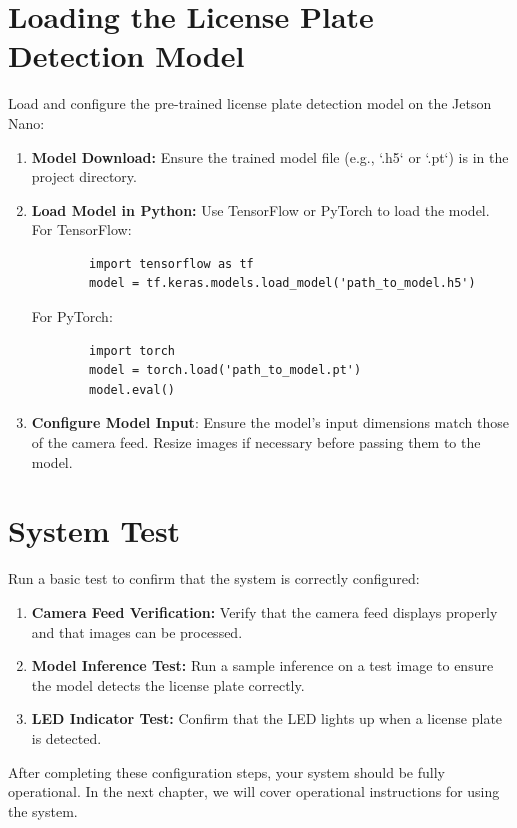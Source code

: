 \section{Loading the License Plate Detection Model}
Load and configure the pre-trained license plate detection model on the Jetson Nano:

\begin{enumerate}
	\item \textbf{Model Download:} Ensure the trained model file (e.g., `.h5` or `.pt`) is in the project directory.
	\item \textbf{Load Model in Python:} Use TensorFlow or PyTorch to load the model. For TensorFlow:
	\begin{verbatim}
		import tensorflow as tf
		model = tf.keras.models.load_model('path_to_model.h5')
	\end{verbatim}
	For PyTorch:
	\begin{verbatim}
		import torch
		model = torch.load('path_to_model.pt')
		model.eval()
	\end{verbatim}
	\item \textbf{Configure Model Input}: Ensure the model’s input dimensions match those of the camera feed. Resize images if necessary before passing them to the model.
\end{enumerate}

\section{System Test}
Run a basic test to confirm that the system is correctly configured:

\begin{enumerate}
	\item \textbf{Camera Feed Verification:} Verify that the camera feed displays properly and that images can be processed.
	\item \textbf{Model Inference Test:} Run a sample inference on a test image to ensure the model detects the license plate correctly.
	\item \textbf{LED Indicator Test:} Confirm that the LED lights up when a license plate is detected.
\end{enumerate}

After completing these configuration steps, your system should be fully operational. In the next chapter, we will cover operational instructions for using the system.
